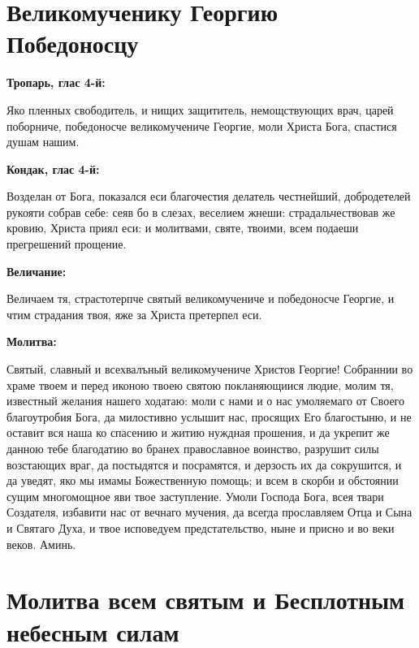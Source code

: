 
 

\section{Великомученику Георгию Победоносцу}
 
\bfseries Тропарь, глас 4-й:\normalfont{}


Яко пленных свободитель, и нищих защититель, немощствующих врач, царей поборниче, победоносче великомучениче Георгие, моли Христа Бога, спастися душам нашим.


\medskip
\bfseries Кондак, глас 4-й:\normalfont{}


Возделан от Бога, показался еси благочестия делатель честнейший, добродетелей рукояти собрав себе: сеяв бо в слезах, веселием жнеши: страдальчествовав же кровию, Христа приял еси: и молитвами, святе, твоими, всем подаеши прегрешений прощение.


\medskip
\bfseries Величание:\normalfont{}


Величаем тя, страстотерпче святый великомучениче и победоносче Георгие, и чтим страдания твоя, яже за Христа претерпел еси.


\medskip
\bfseries Молитва:\normalfont{}


Святый, славный и всехвалъный великомучениче Христов Георгие! Собраннии во храме твоем и перед иконою твоею святою покланяющиися людие, молим тя, известный желания нашего ходатаю: моли с нами и о нас умоляемаго от Своего благоутробия Бога, да милостивно услышит нас, просящих Его благостыню, и не оставит вся наша ко спасению и житию нуждная прошения, и да укрепит же данною тебе благодатию во бранех православное воинство, разрушит силы возстающих враг, да постыдятся и посрамятся, и дерзость их да сокрушится, и да уведят, яко мы имамы Божественную помощь; и всем в скорби и обстоянии сущим многомощное яви твое заступление. Умоли Господа Бога, всея твари Создателя, избавити нас от вечнаго мучения, да всегда прославляем Отца и Сына и Святаго Духа, и твое исповедуем предстательство, ныне и присно и во веки веков. Аминь.


 

\section{Молитва всем святым и Бесплотным небесным силам}
 


